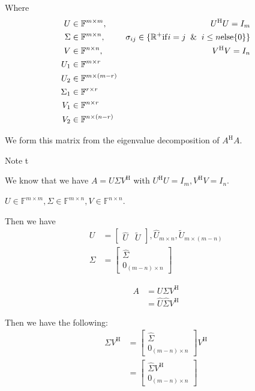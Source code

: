 \documentclass{article}
\begin{document}
Where 
\begin{align*}
    U &\in \mathbb{F}^{m \times m}, & U^\mathrm{H} U = I_m \\
    \Sigma &\in \mathbb{F}^{m \times n}, & \sigma_{ij} \in \{ \mathbb{R}^+ \mathrm{if} i = j \And i \le n \mathrm{else} \{0\} \} \\
    V &\in \mathbb{F}^{n \times n}, & V^\mathrm{H} V = I_n \\
    U_1 &\in \mathbb{F}^{m \times r} \\
    U_2 &\in \mathbb{F}^{m \times (m-r)} \\
    \Sigma_1 &\in \mathbb{F}^{r \times r} \\
    V_1 &\in \mathbb{F}^{n \times r} \\
    V_2 &\in \mathbb{F}^{n \times (n - r)}
\end{align*}

We form this matrix from the eigenvalue decomposition of $A^\mathrm{H} A$.

Note t

We know that we have $A = U \Sigma V^\mathrm{H}$ with $U^\mathrm{H} U = I_m, V^\mathrm{H} V = I_n$.

$U \in \mathbb{F}^{m \times m}, \Sigma \in \mathbb{F}^{m \times n}, V \in \mathbb{F}^{n \times n}$.

Then we have
\begin{align*}
    U &= \begin{bmatrix}
        \hat{U} & \tilde{U}
    \end{bmatrix}, \hat{U}_{m \times n}, \tilde{U}_{m \times (m - n)} \\
    \Sigma &= \begin{bmatrix}
        \hat{\Sigma} \\
        0_{(m-n) \times n}
    \end{bmatrix}
\end{align*}

\begin{align*}
    A &= U \Sigma V^\mathrm{H} \\
    &= \hat{U} \hat{\Sigma} V^\mathrm{H}
\end{align*}

Then we have the following:
\begin{align*}
    \Sigma V^\mathrm{H} &= \begin{bmatrix}
        \hat{\Sigma} \\
        0_{(m-n) \times n}
    \end{bmatrix} V^\mathrm{H} \\
    &= \begin{bmatrix}
        \hat{\Sigma} V^\mathrm{H} \\
        0_{(m-n) \times n}
    \end{bmatrix}
\end{align*}
\end{document}
